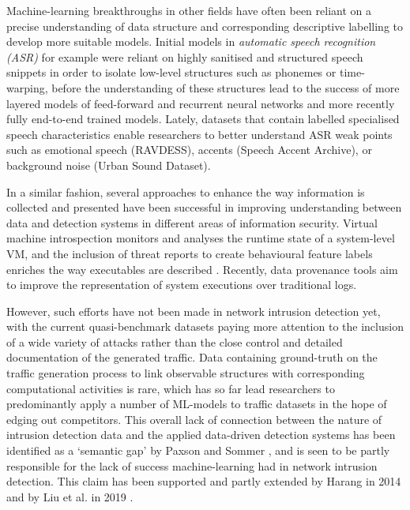 \documentclass[conference]{IEEEtran}
\begin{document}
Machine-learning breakthroughs in other fields have often been reliant on a precise understanding of data structure and corresponding descriptive labelling to develop more suitable models.
Initial models in \textit{automatic speech recognition (ASR)} for example were reliant on highly sanitised and structured speech snippets in order to isolate low-level structures such as phonemes or time-warping, before the understanding of these structures lead to the success of more layered models of feed-forward and recurrent neural networks and more recently fully end-to-end trained models. Lately, datasets that contain labelled specialised speech characteristics enable researchers to better understand ASR weak points such as emotional speech (RAVDESS), accents (Speech Accent Archive), or background noise (Urban Sound Dataset).

In a similar fashion, several approaches to enhance the way information is collected and presented have been successful in improving understanding between data and detection systems in different areas of information security. Virtual machine introspection monitors and analyses the runtime state of a system-level VM, and the inclusion of threat reports to create behavioural feature labels enriches the way executables are described \cite{smith2020mind}. Recently, data provenance tools aim to improve the representation of system executions \cite{barre2019mining} over traditional logs. 

However, such efforts have not been made in network intrusion detection yet, with the current quasi-benchmark datasets paying more attention to the inclusion of a wide variety of attacks rather than the close control and detailed documentation of the generated traffic. Data containing ground-truth on the traffic generation process to link observable structures with corresponding computational activities is rare, which has so far lead researchers to predominantly apply a number of ML-models to traffic datasets in the hope of edging out competitors. %
This overall lack of connection between the nature of intrusion detection data and the applied data-driven detection systems has been identified as a `semantic gap' by Paxson and Sommer \cite{sommer2010outside}, and is seen to be partly responsible for the lack of success machine-learning had in network intrusion detection. This claim has been supported and partly extended by Harang \cite{harang2014bridging} in 2014 and by Liu et al. in 2019 \cite{liu2019machine}.
\end{document}
